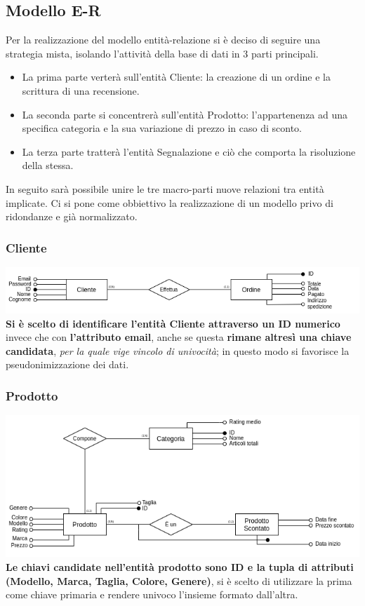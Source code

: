 \subsection{Modello E-R}
Per la realizzazione del modello entità-relazione si è deciso di seguire una strategia mista, isolando l'attività della base di dati in 3 parti principali. 
\begin{itemize}
    \item La prima parte verterà sull'entità Cliente: la creazione di un ordine e la scrittura di una recensione.
    
    \item La seconda parte si concentrerà sull'entità Prodotto: l'appartenenza ad una specifica categoria e la sua variazione di prezzo in caso di sconto.
    
    \item La terza parte tratterà l'entità Segnalazione e ciò che comporta la risoluzione della stessa.
\end{itemize}In seguito sarà possibile unire le tre macro-parti nuove relazioni tra entità implicate. Ci si pone come obbiettivo la realizzazione di un modello privo di ridondanze e già normalizzato. 

\subsubsection{Cliente}
\includegraphics[scale=0.65]{images/cliente.png}
\textbf{Si è scelto di identificare l'entità Cliente attraverso un ID numerico} invece che con\textbf{ l'attributo email}, anche se questa \textbf{rimane altresì una chiave candidata}, \textit{per la quale vige vincolo di univocità}; in questo modo si favorisce la pseudonimizzazione dei dati.

\subsubsection{Prodotto}
\includegraphics[scale=0.65]{images/prodotto.png}
\textbf{Le chiavi candidate nell'entità prodotto sono ID e la tupla di attributi (Modello, Marca, Taglia, Colore, Genere)}, si è scelto di utilizzare la prima come chiave primaria e rendere univoco l'insieme formato dall'altra.
